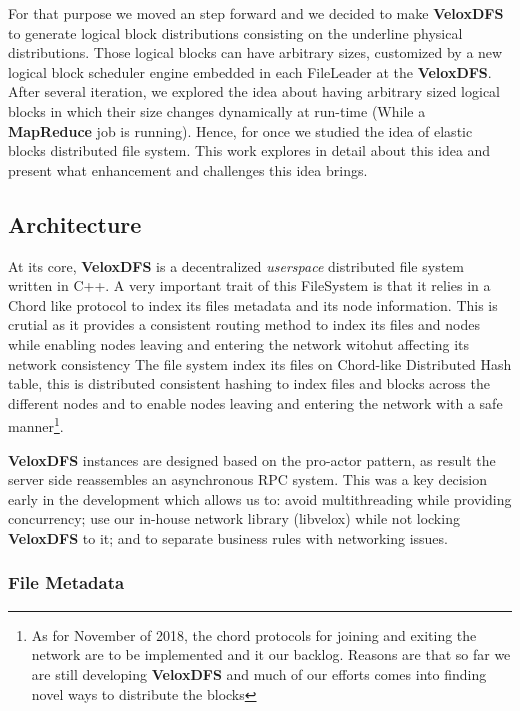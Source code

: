 For that purpose we moved an step forward and we decided to make
\textbf{VeloxDFS} to generate logical block distributions consisting on the
underline physical distributions. Those logical blocks can have arbitrary
sizes, customized by a new logical block scheduler engine embedded in each
FileLeader at the \textbf{VeloxDFS}. \\

After several iteration, we explored the idea about having arbitrary sized
logical blocks in which their size changes dynamically at run-time (While a
\textbf{MapReduce} job is running). Hence, for once we studied the idea of
elastic blocks distributed file system. This work explores in detail about this
idea and present what enhancement and challenges this idea brings.


\subsection{Architecture}

At its core, \textbf{VeloxDFS} is a decentralized \textit{userspace}
distributed file system written in C++.  A very important trait of this
FileSystem is that it relies in a Chord like protocol to index its files
metadata and its node information.  This is crutial as it provides a consistent
routing method to index its files and nodes while enabling nodes leaving and
entering the network witohut affecting its network consistency The file system
index its files on Chord-like Distributed Hash table, this is distributed
consistent hashing to index files and blocks across the different nodes and to
enable nodes leaving and entering the network with a safe manner\footnote{As
for November of 2018, the chord protocols for joining and exiting the network
are to be implemented and it our backlog. Reasons are that so far we are still
developing \textbf{VeloxDFS} and much of our efforts comes into finding novel
ways to distribute the blocks}.

\textbf{VeloxDFS} instances are designed based on the pro-actor pattern, as
result the server side reassembles an asynchronous RPC system. This was a key
decision early in the development which allows us to: avoid multithreading
while providing concurrency; use our in-house network library (libvelox) while
not locking \textbf{VeloxDFS} to it; and to separate business rules with
networking issues. \\

\subsubsection{File Metadata}

